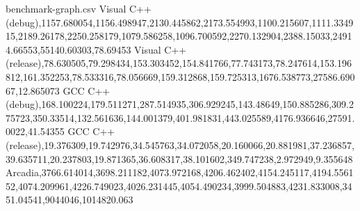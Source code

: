 \begin{filecontents*}{benchmark-graph.csv}
Visual C++ (debug),1157.680054,1156.498947,2130.445862,2173.554993,1100.215607,1111.334915,2189.26178,2250.258179,1079.586258,1096.700592,2270.132904,2388.15033,24914.66553,55140.60303,78.69453
Visual C++ (release),78.630505,79.298434,153.303452,154.841766,77.743173,78.247614,153.196812,161.352253,78.533316,78.056669,159.312868,159.725313,1676.538773,27586.69067,12.865073
GCC C++ (debug),168.100224,179.511271,287.514935,306.929245,143.48649,150.885286,309.275723,350.33514,132.561636,144.001379,401.981831,443.025589,4176.936646,27591.0022,41.54355
GCC C++ (release),19.376309,19.742976,34.545763,34.072058,20.160066,20.881981,37.236857,39.635711,20.237803,19.871365,36.608317,38.101602,349.747238,2.972949,9.355648
Arcadia,3766.614014,3698.211182,4073.972168,4206.462402,4154.245117,4194.556152,4074.209961,4226.749023,4026.231445,4054.490234,3999.504883,4231.833008,3451.04541,9044046,1014820.063
\end{filecontents*}
